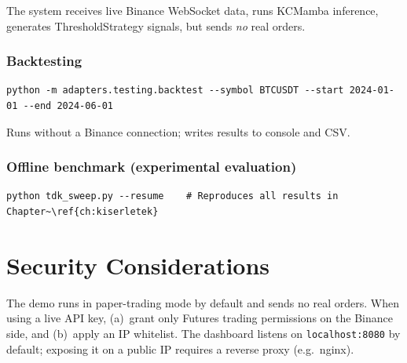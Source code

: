 The system receives live Binance WebSocket data, runs KCMamba inference,
generates ThresholdStrategy signals, but sends \emph{no} real orders.

\subsubsection*{Backtesting}

\begin{verbatim}
python -m adapters.testing.backtest --symbol BTCUSDT --start 2024-01-01 --end 2024-06-01
\end{verbatim}

Runs without a Binance connection; writes results to console and CSV.

\subsubsection*{Offline benchmark (experimental evaluation)}

\begin{verbatim}
python tdk_sweep.py --resume    # Reproduces all results in Chapter~\ref{ch:kiserletek}
\end{verbatim}

\section{Security Considerations}

The demo runs in paper-trading mode by default and sends no real orders.
When using a live API key, (a)~grant only Futures trading permissions on
the Binance side, and (b)~apply an IP whitelist. The dashboard listens on
\texttt{localhost:8080} by default; exposing it on a public IP requires
a reverse proxy (e.g.\ nginx).
